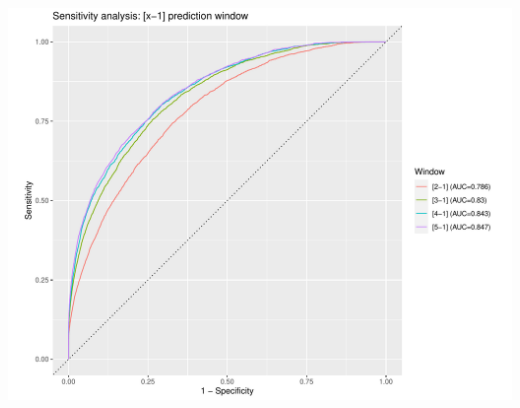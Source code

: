 \documentclass[12pt]{article}
\begin{document}
\begin{center}
\includegraphics[width=\textwidth]{sensitivity_window/roc_curves_x-1.pdf}
\end{center}
\end{document}
